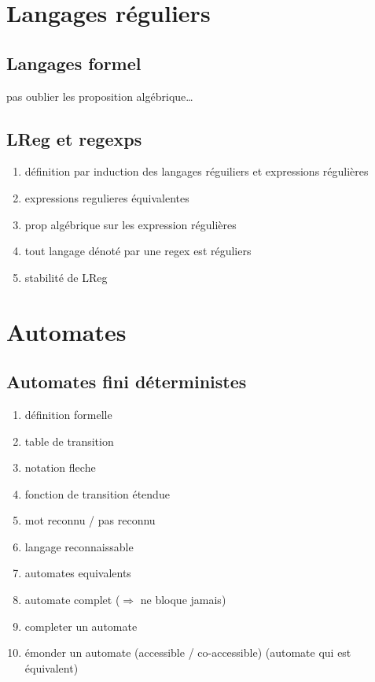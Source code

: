\section{Langages réguliers}
\subsection{Langages formel}
pas oublier les proposition algébrique\dots

\subsection{LReg et regexps}
\begin{enumerate}
    \item définition par induction des langages réguiliers et expressions régulières
    \item expressions regulieres équivalentes
    \item prop algébrique sur les expression régulières
    \item tout langage dénoté par une regex est réguliers
    \item stabilité de LReg
\end{enumerate}


\section{Automates}
\subsection{Automates fini déterministes}

\begin{enumerate}
    \item définition formelle
    \item table de transition
    \item notation fleche
    \item fonction de transition étendue
    \item mot reconnu / pas reconnu
    \item langage reconnaissable
    \item automates equivalents
    \item automate complet ($\Rightarrow$ ne bloque jamais)
    \item completer un automate
    \item émonder un automate (accessible / co-accessible) (automate qui est équivalent)
\end{enumerate}

